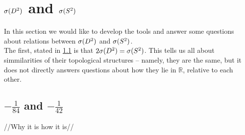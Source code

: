 \section{${{\sigma}(D^2)}$ and ${{\sigma}(S^2)}$}
In this section we would like to develop the tools and answer some questions about 
relations between ${{\sigma}(D^2)}$ and ${{\sigma}(S^2)}$. \\
The first, stated in \ref{} is that $2{{\sigma}(D^2)}={{\sigma}(S^2)}$. 
This tells us all about simmilarities of their topological structures -- namely, 
they are the same, 
but it does not directly answers questions about how they lie in $\mathbb{R}$, relative 
to each other. 
\subsection{$-\frac{1}{84}$ and $-\frac{1}{42}$}
//Why it is how it is//
